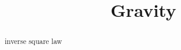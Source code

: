 \documentclass{ximera}
\title{Gravity}
\begin{document}
\begin{abstract}
inverse square law
\end{abstract}
\maketitle
\end{document}
